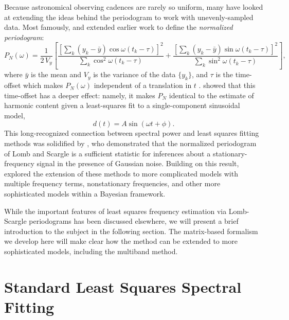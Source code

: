 \documentclass[12pt,preprint]{aastex}
\newcommand{\eqlabel}[1]{\label{eq:#1}}
\newcommand{\sectlabel}[1]{\label{sect:#1}}
\begin{document}
Because astronomical observing cadences are rarely so uniform, many have looked at extending the ideas behind the periodogram to work with unevenly-sampled data. Most famously, \citet{Lomb76} and \citet{Scargle82} extended earlier work to define the {\it normalized periodogram}:
\begin{equation}
  \eqlabel{LombScargle}
  P_N(\omega) = \frac{1}{2\,V_y}\left[
    \frac{\left[\sum_k(y_k - \bar{y})\cos\omega(t_k - \tau)\right]^2}
    {\sum_k \cos^2\omega(t_k - \tau)}
    +
    \frac{\left[\sum_k(y_k - \bar{y})\sin\omega(t_k - \tau)\right]^2}
    {\sum_k \sin^2\omega(t_k - \tau)}
\right],
\end{equation}
where $\bar{y}$ is the mean and $V_y$ is the variance of the data $\{y_k\}$, and $\tau$ is the time-offset which makes $P_N(\omega)$ independent of a translation in $t$ \citep[see][for an in-depth discussion]{NumRec}. \citet{Lomb76} showed that this time-offset has a deeper effect: namely, it makes $P_N$ identical to the estimate of harmonic content given a least-squares fit to a single-component sinusoidal model,
\begin{equation}
  \eqlabel{SingleModel}
  d(t) = A\sin(\omega t + \phi).
\end{equation}
This long-recognized connection between spectral power and least squares fitting methods was solidified by \citet{Jaynes87}, who demonstrated that the normalized periodogram of Lomb and Scargle is a sufficient statistic for inferences about a stationary-frequency signal in the presence of Gaussian noise. Building on this result, \citet{Bretthorst88} explored the extension of these methods to more complicated models with multiple frequency terms, nonstationary frequencies, and other more sophisticated models within a Bayesian framework.

While the important features of least squares frequency estimation via Lomb-Scargle periodograms has been discussed elsewhere, we will present a brief introduction to the subject in the following section.
The matrix-based formalism we develop here will make clear how the method can be extended to more sophisticated models, including the multiband method.


\section{Standard Least Squares Spectral Fitting}
\sectlabel{matrix_formalism}
\end{document}
